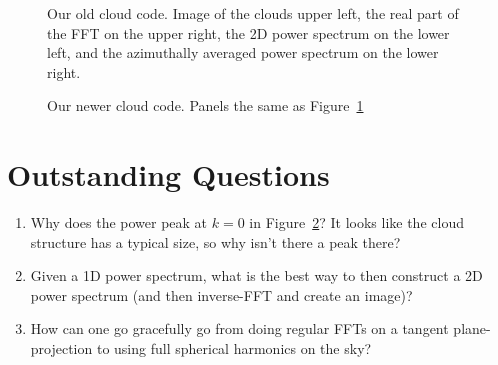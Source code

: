 \documentclass[11pt,preprint]{aastex}
\begin{document}
\begin{figure}
\caption{Our old cloud code.  Image of the clouds upper left, the real part of the FFT on the upper right, the 2D power spectrum on the lower left, and the azimuthally averaged power spectrum on the lower right. \label{oldc}}
\end{figure}


\begin{figure}
\caption{Our newer cloud code. Panels the same as Figure~\ref{oldc}\label{newc}}
\end{figure}




\section{Outstanding Questions}
\begin{enumerate}
\item{Why does the power peak at $k=0$ in Figure~\ref{newc}?  It looks like the cloud structure has a typical size, so why isn't there a peak there?}
\item{Given a 1D power spectrum, what is the best way to then construct a 2D power spectrum (and then inverse-FFT and create an image)?}
\item{How can one go gracefully go from doing regular FFTs on a tangent plane-projection to using full spherical harmonics on the sky?}
\end{enumerate}
\end{document}
